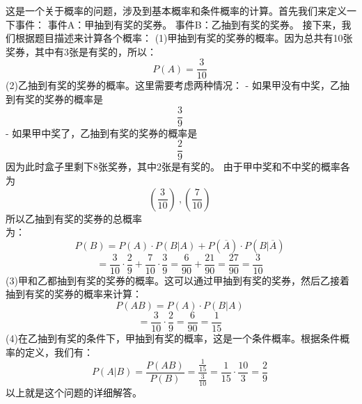 
这是一个关于概率的问题，涉及到基本概率和条件概率的计算。首先我们来定义一下事件：  事件A：甲抽到有奖的奖券。 事件B：乙抽到有奖的奖券。 接下来，我们根据题目描述来计算各个概率： (1)甲抽到有奖的奖券的概率。因为总共有10张奖券，其中有3张是有奖的，所以： \begin{equation}
 P(A) = \frac{3}{10}  ~
\end{equation}(2)乙抽到有奖的奖券的概率。这里需要考虑两种情况： - 如果甲没有中奖，乙抽到有奖的奖券的概率是
\begin{equation}
 \frac{3}{9}~
\end{equation}
 - 如果甲中奖了，乙抽到有奖的奖券的概率是 \begin{equation}
 \frac{2}{9}~
 \end{equation}因为此时盒子里剩下8张奖券，其中2张是有奖的。 由于甲中奖和不中奖的概率各为 \begin{equation}
 ( \frac{3}{10} )~,(\frac{7}{10})~
 \end{equation}所以乙抽到有奖的奖券的总概率 \begin{equation}
 
 \end{equation}  为： \begin{equation}
  P(B) = P(A) \cdot P(B|A) + P(\overline{A}) \cdot P(B|\overline{A})~
 \end{equation}\begin{equation}
 = \frac{3}{10} \cdot \frac{2}{9} + \frac{7}{10} \cdot \frac{3}{9} = \frac{6}{90} + \frac{21}{90} = \frac{27}{90} = \frac{3}{10} ~
 \end{equation}(3)甲和乙都抽到有奖的奖券的概率。这可以通过甲抽到有奖的奖券，然后乙接着抽到有奖的奖券的概率来计算： \begin{equation}
  P(AB) = P(A) \cdot P(B|A) ~
 \end{equation}
 \begin{equation}
 = \frac{3}{10} \cdot \frac{2}{9} = \frac{6}{90} = \frac{1}{15} ~
 \end{equation}
 (4)在乙抽到有奖的条件下，甲抽到有奖的概率，这是一个条件概率。根据条件概率的定义，我们有： \begin{equation}
  P(A|B) = \frac{P(AB)}{P(B)}  = \frac{\frac{1}{15}}{\frac{3}{10}}= \frac{1}{15} \cdot \frac{10}{3} = \frac{2}{9}  ~
 \end{equation}
 以上就是这个问题的详细解答。

